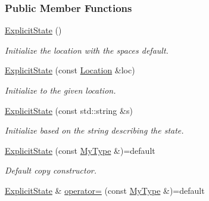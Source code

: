 \subsubsection*{Public Member Functions}
\begin{DoxyCompactItemize}
\item 
\hyperlink{structExplicitState_aaa66bb1b50cda1f5717368b04ab24c95}{Explicit\+State} ()\hypertarget{structExplicitState_aaa66bb1b50cda1f5717368b04ab24c95}{}\label{structExplicitState_aaa66bb1b50cda1f5717368b04ab24c95}

\begin{DoxyCompactList}\small\item\em Initialize the location with the space\textquotesingle{}s default. \end{DoxyCompactList}\item 
\hyperlink{structExplicitState_ada81c6e01f3828230a573c3901ae8050}{Explicit\+State} (const \hyperlink{structExplicitState_a3801fbf90c7e687071c21a05de368748}{Location} \&loc)
\begin{DoxyCompactList}\small\item\em Initialize to the given location. \end{DoxyCompactList}\item 
\hyperlink{structExplicitState_a859fc1f7a5584f7c09caa17c7b36dbd3}{Explicit\+State} (const std\+::string \&s)
\begin{DoxyCompactList}\small\item\em Initialize based on the string describing the state. \end{DoxyCompactList}\item 
\hyperlink{structExplicitState_a874aabbc73e4fa2cd7248b36098564e8}{Explicit\+State} (const \hyperlink{structExplicitState_af241851bd63508f24157e7a0a71c924a}{My\+Type} \&)=default\hypertarget{structExplicitState_a874aabbc73e4fa2cd7248b36098564e8}{}\label{structExplicitState_a874aabbc73e4fa2cd7248b36098564e8}

\begin{DoxyCompactList}\small\item\em Default copy constructor. \end{DoxyCompactList}\item 
\hyperlink{structExplicitState}{Explicit\+State} \& \hyperlink{structExplicitState_a22cb81c520282a3c00c9c5a634e8f198}{operator=} (const \hyperlink{structExplicitState_af241851bd63508f24157e7a0a71c924a}{My\+Type} \&)=default\hypertarget{structExplicitState_a22cb81c520282a3c00c9c5a634e8f198}{}\label{structExplicitState_a22cb81c520282a3c00c9c5a634e8f198}


\end{DoxyCompactItemize}
